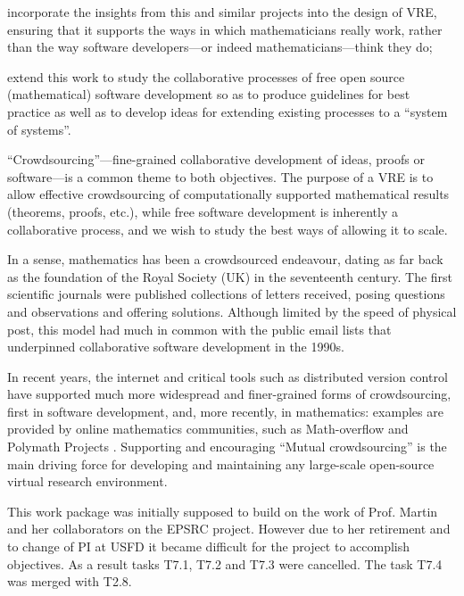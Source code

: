 \begin{workpackage}[id=social-aspects,wphases=0-48,
  title=Social Aspects (canceled),
  lead=UO,
  UORM=6,status=canceled]
\begin{wpobjectives}
\begin{compactitem}
\item incorporate the insights from this and similar projects into the
  design of \TheProject VRE, ensuring that it supports the ways in
  which mathematicians really work, rather than the way software
  developers---or indeed mathematicians---think they do;
\item extend this work to study the collaborative processes of free
  open source (mathematical) software development so as to produce
  guidelines for best practice as well as to develop ideas for extending existing processes
  to a ``system of systems''.
\end{compactitem}
\end{wpobjectives}

\begin{wpdescription}
\color{gray}
``Crowdsourcing''---fine-grained collaborative development of ideas,
  proofs or software---is a common theme to both objectives. The purpose
  of a VRE is to allow effective crowdsourcing of computationally
  supported mathematical results (theorems, proofs, etc.),
  while free software development is inherently a collaborative process,
  and we wish to study the best ways of allowing it to scale.

  In a sense, mathematics has been a crowdsourced endeavour, dating as
  far back as the foundation of the Royal Society (UK) in the seventeenth
  century.  The first scientific journals were published collections
  of letters received, posing questions and observations and offering
  solutions.  Although limited by the speed of physical post, this
  model had much in common with the public email lists that
  underpinned collaborative software development in the 1990s.

  In recent years, the internet and critical tools such as distributed
  version control have supported much more widespread and finer-grained
  forms of crowdsourcing, first in software development, and, more recently,
  in mathematics: examples are provided by online mathematics communities, such as Math-overflow
  \cite{MathOverflow} and Polymath Projects \cite{polymath_SIAM,
  PolymathBlog}.  Supporting and encouraging ``Mutual
  crowdsourcing'' is the main driving force for developing and
  maintaining any large-scale open-source virtual research
  environment.

  This work package was initially supposed to build on the work of Prof. Martin and her collaborators on the EPSRC
  project. However due to her retirement and to change of PI
  at USFD it became difficult for the project to accomplish objectives.
  As a result tasks T7.1, T7.2 and T7.3 were cancelled. The task T7.4 was merged with T2.8.


\end{wpdescription}
\end{workpackage}

